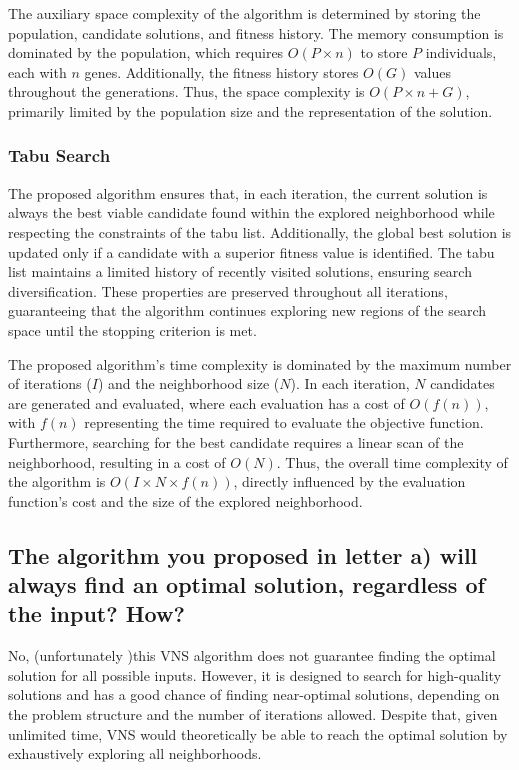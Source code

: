 \documentclass{article}
\begin{document}
	The auxiliary space complexity of the algorithm is determined by storing the population, candidate solutions, and fitness history. The memory consumption is dominated by the population, which requires $O(P \times n)$ to store $P$ individuals, each with $n$ genes. Additionally, the fitness history stores $O(G)$ values throughout the generations. Thus, the space complexity is $O(P \times n + G)$, primarily limited by the population size and the representation of the solution.
	

	\subsubsection{Tabu Search}
	
	The proposed algorithm ensures that, in each iteration, the current solution is always the best viable candidate found within the explored neighborhood while respecting the constraints of the tabu list. Additionally, the global best solution is updated only if a candidate with a superior fitness value is identified. The tabu list maintains a limited history of recently visited solutions, ensuring search diversification. These properties are preserved throughout all iterations, guaranteeing that the algorithm continues exploring new regions of the search space until the stopping criterion is met.

	The proposed algorithm's time complexity is dominated by the maximum number of iterations ($I$) and the neighborhood size ($N$). In each iteration, $N$ candidates are generated and evaluated, where each evaluation has a cost of $O(f(n))$, with $f(n)$ representing the time required to evaluate the objective function. Furthermore, searching for the best candidate requires a linear scan of the neighborhood, resulting in a cost of $O(N)$. Thus, the overall time complexity of the algorithm is $O(I \times N \times f(n))$, directly influenced by the evaluation function's cost and the size of the explored neighborhood.
	
	
	\subsection{The algorithm you proposed in letter a) will always find an optimal solution, regardless of the input? How?}
	
	No, (unfortunately )this VNS algorithm does not guarantee finding the optimal solution for all possible inputs. However, it is designed to search for high-quality solutions and has a good chance of finding near-optimal solutions, depending on the problem structure and the number of iterations allowed. Despite that, given unlimited time, VNS would theoretically be able to reach the optimal solution by exhaustively exploring all neighborhoods.
	
\end{document}
